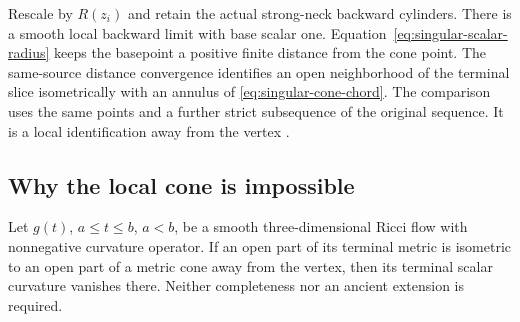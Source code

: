 Rescale by $R(z_i)$ and retain the actual strong-neck backward cylinders.
There is a smooth local backward limit with base scalar one.
Equation~\eqref{eq:singular-scalar-radius} keeps the basepoint a positive
finite distance from the cone point. The same-source distance convergence
identifies an open neighborhood of the terminal slice isometrically with
an annulus of \eqref{eq:singular-cone-chord}. The comparison uses the same
points and a further strict subsequence of the original sequence. It is a
local identification away from the vertex
\cite[Claim 10.31 and Sections 10.5--10.6, pp. 263--265]{MT2007}.

\subsection{Why the local cone is impossible}

\begin{lemma}
\label{lem:singular-cone-obstruction}
Let $g(t)$, $a\leq t\leq b$, $a<b$, be a smooth three-dimensional Ricci
flow with nonnegative curvature operator. If an open part of its terminal
metric is isometric to an open part of a metric cone away from the vertex,
then its terminal scalar curvature vanishes there. Neither completeness nor
an ancient extension is required.
\end{lemma}


